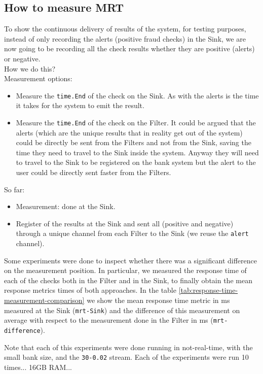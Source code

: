 \subsection{How to measure MRT}\label{exp-measuring-mrt}

To show the continuous delivery of results of the system, for testing purposes, instead of only recording the alerts (positive fraud checks) in the Sink, we are now going to be recording all the check results whether they are positive (alerts) or negative.\\
How we do this?\\
Measurement options:
\begin{itemize}
    \item Measure the \texttt{time.End} of the check on the Sink. As with the alerts is the time it takes for the system to emit the result.
    \item Measure the \texttt{time.End} of the check on the Filter. It could be argued that the alerts (which are the unique results that in reality get out of the system) could be directly be sent from the Filters and not from the Sink, saving the time they need to travel to the Sink inside the system. Anyway they will need to travel to the Sink to be registered on the bank system but the alert to the user could be directly sent faster from the Filters.
\end{itemize}

So far:
\begin{itemize}
    \item Measurement: done at the Sink.
    \item Register of the results at the Sink and sent all (positive and negative) through a unique channel from each Filter to the Sink (we reuse the \texttt{alert} channel).
\end{itemize}

Some experiments were done to inspect whether there was a significant difference on the measurement position. In particular, we measured the response time of each of the checks both in the Filter and in the Sink, to finally obtain the mean response metrics times of both approaches. In the table \ref{tab:response-time-measurement-comparison} we show the mean response time metric in ms measured at the Sink (\texttt{mrt-Sink}) and the difference of this measurement on average with respect to the measurement done in the Filter in ms (\texttt{mrt-difference}).

Note that each of this experiments were done running in not-real-time, with the small bank size, and the \texttt{30-0.02} stream. Each of the experiments were run 10 times... 16GB RAM...

